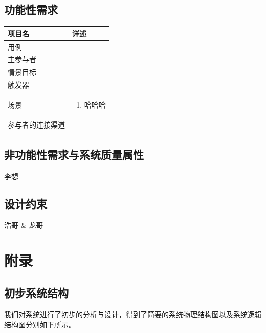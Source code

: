 \documentclass{ctexrep}
\begin{document}
\section{功能性需求}
\begin{longtable}{p{2cm} | p{10cm}}
\hline
项目名 & 详述 \\
\hline
\hline
用例 & \\
\hline
主参与者 & \\
\hline
情景目标 & \\
\hline
触发器 & \\
\hline
场景 & \begin{enumerate}
	\item 哈哈哈
\end{enumerate} \\
\hline
参与者的连接渠道 & \\
\hline
\end{longtable}







\section{非功能性需求与系统质量属性}
李想
\section{设计约束}
浩哥 \& 龙哥

\chapter{附录}
\section{初步系统结构}
我们对系统进行了初步的分析与设计，得到了简要的系统物理结构图以及系统逻辑结构图分别如下所示。
\end{document}
